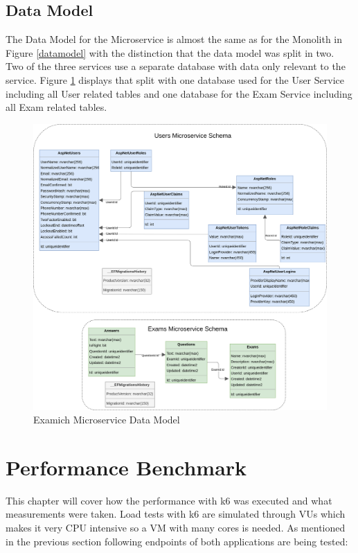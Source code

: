 \documentclass[BIF,Bachelor,nenglish]{twbook}%
\begin{document}
\subsection{Data Model}
The Data Model for the Microservice is almost the same as for the Monolith in Figure \ref{datamodel} with the distinction that the data model was split in two. Two of the three services use a separate database with data only relevant to the service. Figure \ref{datamodelmicroservice} displays that split with one database used for the User Service including all User related tables and one database for the Exam Service including all Exam related tables.
\begin{figure} [H]
 \begin{center}
    \includegraphics[width=1\linewidth]{img/ExamichMicroserviceDataModel.png}
 \end{center}
 \caption{Examich Microservice Data Model}
 \label{datamodelmicroservice}
\end{figure}

\section{Performance Benchmark}
This chapter will cover how the performance with k6 was executed and what measurements were taken. Load tests with k6 are simulated through \ac{VU}s which makes it very CPU intensive so a VM with many cores is needed. As mentioned in the previous section following endpoints of both applications are being tested:
\end{document}

